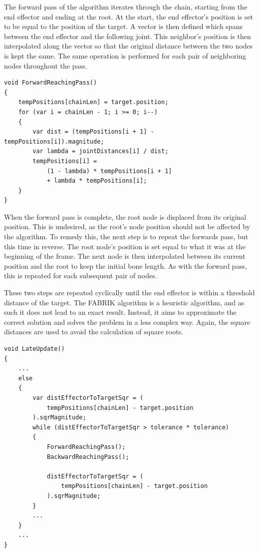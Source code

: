 The forward pass of the algorithm iterates through the chain, starting from the
end effector and ending at the root. At the start, the end effector's position
is set to be equal to the position of the target. A vector is then defined which
spans between the end effector and the following joint. This neighbor's position
is then interpolated along the vector so that the original distance between the
two nodes is kept the same. The same operation is performed for each pair of
neighboring nodes throughout the pass. 

\begin{lstlisting}[basicstyle=\footnotesize, numbers=none,frame=single,
caption={FABRIK forward reaching pass},captionpos=b, label=forwards, language={[Sharp]c}]
void ForwardReachingPass()
{
    tempPositions[chainLen] = target.position;
    for (var i = chainLen - 1; i >= 0; i--)
    {
        var dist = (tempPositions[i + 1] - tempPositions[i]).magnitude;
        var lambda = jointDistances[i] / dist;
        tempPositions[i] =
            (1 - lambda) * tempPositions[i + 1]
            + lambda * tempPositions[i];
    }
}
\end{lstlisting}

When the forward pass is complete, the root node is displaced from its original
position. This is undesired, as the root's node position should not be affected
by the algorithm. To remedy this, the next step is to repeat the forwards pass,
but this time in reverse. The root node's position is set equal to what it was
at the beginning of the frame. The next node is then interpolated between its
current position and the root to keep the initial bone length. As with the
forward pass, this is repeated for each subsequent pair of nodes. 

These two steps are repeated cyclically until the end effector is within
a threshold distance of the target. The FABRIK algorithm is a heuristic
algorithm, and as such it does not lead to an exact result. Instead, it aims to
approximate the correct solution and solves the problem in a less complex way.
Again, the square distances are used to avoid the calculation of square roots. 


\begin{lstlisting}[basicstyle=\footnotesize, numbers=none,frame=single,
caption={Main iteration loop of FABRIK},captionpos=b, label=full_loop, language={[Sharp]c}]
void LateUpdate()
{
    ...
    else
    {
        var distEffectorToTargetSqr = (
            tempPositions[chainLen] - target.position
        ).sqrMagnitude;
        while (distEffectorToTargetSqr > tolerance * tolerance)
        {
            ForwardReachingPass();
            BackwardReachingPass();

            distEffectorToTargetSqr = (
                tempPositions[chainLen] - target.position
            ).sqrMagnitude;
        }
        ...
    }
    ...
}
\end{lstlisting}

